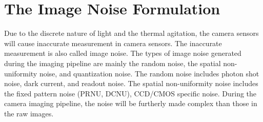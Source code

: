 \section{The Image Noise Formulation}
\label{sec:intro:current}

Due to the discrete nature of light and the thermal agitation, the camera sensors will cause inaccurate measurement in camera sensors. The inaccurate measurement is also called image noise. The types of image noise generated during the imaging pipeline are mainly the random noise, the spatial non-uniformity noise, and quantization noise. The random noise includes photon shot noise, dark current, and readout noise. The spatial non-uniformity noise includes the fixed pattern noise (PRNU, DCNU), CCD/CMOS specific noise. During the camera imaging pipeline, the noise will be furtherly made complex than those in the raw images.


